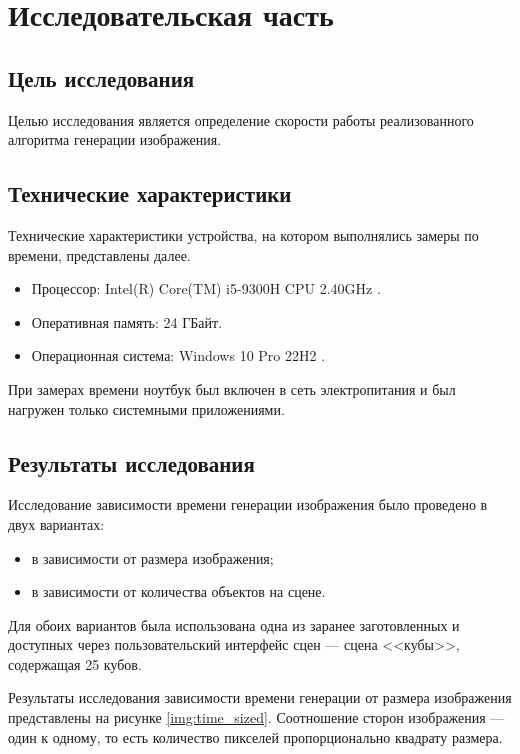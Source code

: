 \section{Исследовательская часть}


\subsection{Цель исследования}

Целью исследования является определение скорости работы реализованного алгоритма генерации изображения.


\subsection{Технические характеристики}

Технические характеристики устройства, на котором выполнялись замеры по времени, представлены далее.


\begin{itemize}
	\item Процессор: Intel(R) Core(TM) i5-9300H CPU 2.40GHz \cite{intel}.
	\item Оперативная память: 24 ГБайт.
	\item Операционная система: Windows 10 Pro 22H2 \cite{windows}.
\end{itemize}


При замерах времени ноутбук был включен в сеть электропитания и был нагружен только системными приложениями.


\subsection{Результаты исследования}

Исследование зависимости времени генерации изображения было проведено в двух вариантах:

\begin{itemize}
	\item в зависимости от размера изображения;
	\item в зависимости от количества объектов на сцене.
\end{itemize}

Для обоих вариантов была использована одна из заранее заготовленных и доступных через пользовательский интерфейс сцен --- сцена <<кубы>>, содержащая 25 кубов.

Результаты исследования зависимости времени генерации от размера изображения представлены на рисунке \ref{img:time_sized}. Соотношение сторон изображения --- один к одному, то есть количество пикселей пропорционально квадрату размера.

